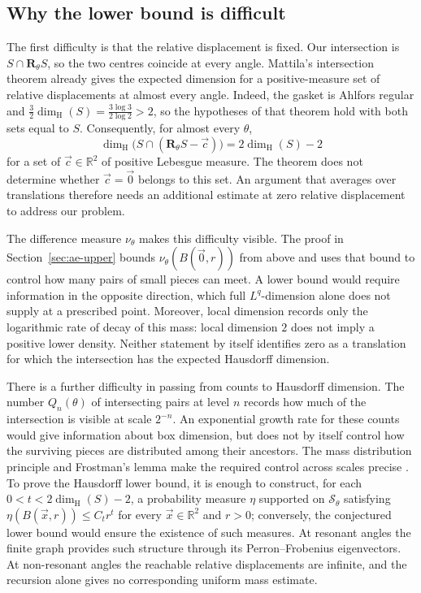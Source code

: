 \documentclass[scheme=plain]{ctexart}
\newcommand{\dimhaus}{\dim_\mathrm{H}}
\begin{document}
\subsection{Why the lower bound is difficult}

The first difficulty is that the relative displacement is fixed.
Our intersection is $S\cap\mathbf R_\theta S$, so the two centres coincide at every angle.
Mattila's intersection theorem \cite[Theorem~4.1]{Mattila2021} already gives the expected dimension for a positive-measure set of relative displacements at almost every angle.
Indeed, the gasket is Ahlfors regular and $\frac32\dimhaus(S)=\frac{3\log3}{2\log2}>2$, so the hypotheses of that theorem hold with both sets equal to $S$.
Consequently, for almost every $\theta$,
\[
\dimhaus\bigl(S\cap(\mathbf R_\theta S-\vec c)\bigr)=2\dimhaus(S)-2
\]
for a set of $\vec c\in\mathbb R^2$ of positive Lebesgue measure.
The theorem does not determine whether $\vec c=\vec{0}$ belongs to this set.
An argument that averages over translations therefore needs an additional estimate at zero relative displacement to address our problem.

The difference measure $\nu_\theta$ makes this difficulty visible.
The proof in Section~\ref{sec:ae-upper} bounds $\nu_\theta(B(\vec{0},r))$ from above and uses that bound to control how many pairs of small pieces can meet.
A lower bound would require information in the opposite direction, which full $L^q$-dimension alone does not supply at a prescribed point.
Moreover, local dimension records only the logarithmic rate of decay of this mass: local dimension $2$ does not imply a positive lower density.
Neither statement by itself identifies zero as a translation for which the intersection has the expected Hausdorff dimension.

There is a further difficulty in passing from counts to Hausdorff dimension.
The number $Q_n(\theta)$ of intersecting pairs at level $n$ records how much of the intersection is visible at scale $2^{-n}$.
An exponential growth rate for these counts would give information about box dimension, but does not by itself control how the surviving pieces are distributed among their ancestors.
The mass distribution principle and Frostman's lemma make the required control across scales precise \cite[Mass distribution principle~4.2 and Corollary~4.12]{Falconer2003}.
To prove the Hausdorff lower bound, it is enough to construct, for each $0<t<2\dimhaus(S)-2$, a probability measure $\eta$ supported on $\mathcal S_\theta$ satisfying $\eta(B(\vec x,r))\le C_t r^t$ for every $\vec x\in\mathbb R^2$ and $r>0$; conversely, the conjectured lower bound would ensure the existence of such measures.
At resonant angles the finite graph provides such structure through its Perron--Frobenius eigenvectors.
At non-resonant angles the reachable relative displacements are infinite, and the recursion alone gives no corresponding uniform mass estimate.
\end{document}
